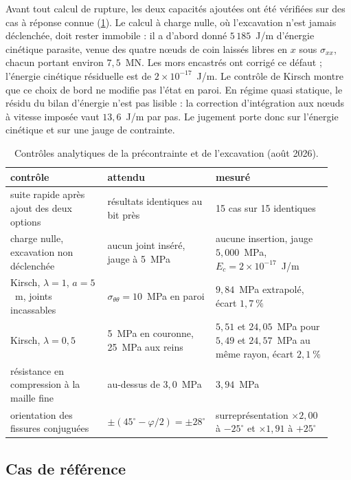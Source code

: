 Avant tout calcul de rupture, les deux capacités ajoutées ont été vérifiées sur des cas à réponse connue (\cref{tab-tun-controles}). Le calcul à charge nulle, où l'excavation n'est jamais déclenchée, doit rester immobile : il a d'abord donné $5\,185$~J/m d'énergie cinétique parasite, venue des quatre nœuds de coin laissés libres en $x$ sous $\sigma_{xx}$, chacun portant environ $7{,}5$~MN. Les mors encastrés ont corrigé ce défaut ; l'énergie cinétique résiduelle est de $2\times10^{-17}$~J/m. Le contrôle de Kirsch montre que ce choix de bord ne modifie pas l'état en paroi. En régime quasi statique, le résidu du bilan d'énergie n'est pas lisible : la correction d'intégration aux nœuds à vitesse imposée vaut $13{,}6$~J/m par pas. Le jugement porte donc sur l'énergie cinétique et sur une jauge de contrainte.

\begin{table}[htbp]
\centering
\caption{Contrôles analytiques de la précontrainte et de l'excavation (août 2026).}
\label{tab-tun-controles}
\small
\begin{tabular}{@{}p{0.30\linewidth}p{0.27\linewidth}p{0.36\linewidth}@{}}
\toprule
contrôle & attendu & mesuré \\
\midrule
suite rapide après ajout des deux options & résultats identiques au bit près & 15 cas sur 15 identiques \\
charge nulle, excavation non déclenchée & aucun joint inséré, jauge à 5~MPa & aucune insertion, jauge $5{,}000$~MPa, $E_c = 2\times10^{-17}$~J/m \\
Kirsch, $\lambda = 1$, $a = 5$~m, joints incassables & $\sigma_{\theta\theta} = 10$~MPa en paroi & $9{,}84$~MPa extrapolé, écart $1{,}7~\%$ \\
Kirsch, $\lambda = 0{,}5$ & 5~MPa en couronne, 25~MPa aux reins & $5{,}51$ et $24{,}05$~MPa pour $5{,}49$ et $24{,}57$~MPa au même rayon, écart $2{,}1~\%$ \\
résistance en compression à la maille fine & au-dessus de $3{,}0$~MPa & $3{,}94$~MPa \\
orientation des fissures conjuguées & $\pm(45^\circ - \varphi/2) = \pm 28^\circ$ & surreprésentation $\times 2{,}00$ à $-25^\circ$ et $\times 1{,}91$ à $+25^\circ$ \\
\bottomrule
\end{tabular}
\end{table}

\subsection{Cas de référence}

